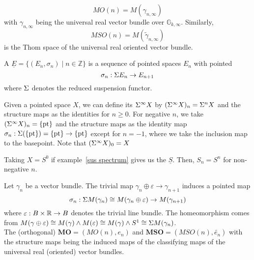 \documentclass[a4paper,11pt]{article}
\begin{document}
\begin{example}
    \[MO(n)=M(\gamma_{n,\infty})\] with \(\gamma_{n,\infty}\) being the universal real vector bundle over \(\mathbb{G}_{k,\infty}\). Similarly,
    \[MSO(n)= M(\tilde\gamma_{n,\infty}) \]
    is the Thom space of the universal real oriented vector bundle.
\end{example}

\begin{definition}
    A  \(\underline E = \{(E_n,\sigma_n)\mid n\in\mathbb{Z}\}\) is a sequence of pointed spaces \(E_n\) with pointed \[\sigma_n:\Sigma E_n\to E_{n+1}\]
    where \(\Sigma\) denotes the reduced suspension functor.
\end{definition}

\begin{example}\label{sus spectrum}
    Given a pointed space \(X\), we can define its  \(\Sigma^\infty X\) by \((\Sigma^\infty X)_n=\Sigma^n X\) and the structure maps as the identities for \(n\geq0\). For negative \(n\), we take \((\Sigma^\infty X)_n=\{\mathrm{pt}\}\) and the structure maps as the identity map \(\sigma_n:\Sigma(\{\mathrm{pt}\})=\{\mathrm{pt}\}\to\{\mathrm{pt}\}\) except for \(n=-1\), where we take the inclusion map to the basepoint.
    Note that \((\Sigma^\infty X)_0=X\)
\end{example}

\begin{example}
    Taking \(X=S^0\) if example\ \ref{sus spectrum} gives us the  \(\underline{S}\). Then, \(S_n=S^n\) for non-negative \(n\).
\end{example}

\begin{example}[Thom spectrum\ {\cite[Beispiel IV.1.2(b)]{brocker}}]
    Let \(\gamma_n\) be a vector bundle. The trivial map \(\gamma_n\oplus\varepsilon\to\gamma_{n+1}\) induces a pointed map
    \[\sigma_n:\Sigma M(\gamma_n)\cong M(\gamma_n\oplus \varepsilon)\to M(\gamma_{n+1})\]
    where \(\varepsilon:B\times\mathbb{R}\to B\) denotes the trivial line bundle. The homeomorphism comes from \(M(\gamma\oplus\varepsilon)\cong M(\gamma)\land M(\varepsilon)\cong M(\gamma)\land S^1\cong \Sigma M(\gamma_n)\).\\
    The (orthogonal)  \(\mathbf{MO}=(MO(n),e_n)\) and \(\mathbf{MSO}=(MSO(n),\widetilde{e_n})\) with the structure maps being the induced maps of the classifying maps of the universal real (oriented) vector bundles.
\end{example}
\end{document}
